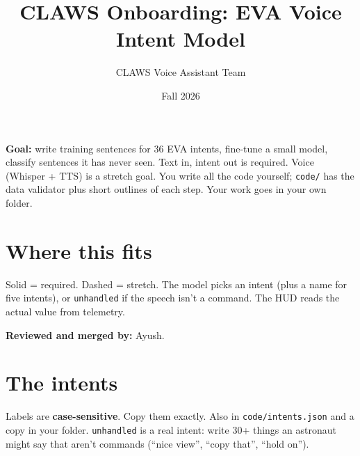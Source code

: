 \documentclass[11pt]{article}
\title{\textbf{CLAWS Onboarding: EVA Voice Intent Model}}
\author{CLAWS Voice Assistant Team}
\date{Fall 2026}
\begin{document}
\maketitle

\textbf{Goal:} write training sentences for 36 EVA intents, fine-tune a small
model, classify sentences it has never seen. Text in, intent out is required.
Voice (Whisper + TTS) is a stretch goal. You write all the code yourself;
\texttt{code/} has the data validator plus short outlines of each step.
Your work goes in your own folder.

\section{Where this fits}

\begin{center}
\end{center}

Solid = required. Dashed = stretch. The model picks an intent (plus a name for
five intents), or \texttt{unhandled} if the speech isn't a command. The HUD
reads the actual value from telemetry.

\textbf{Reviewed and merged by:} Ayush.

\newpage
\section{The intents}

Labels are \textbf{case-sensitive}. Copy them exactly. Also in
\texttt{code/intents.json} and a copy in your folder. \texttt{unhandled} is a real intent: write 30+
things an astronaut might say that aren't commands (``nice view'', ``copy
that'', ``hold on'').
\end{document}
